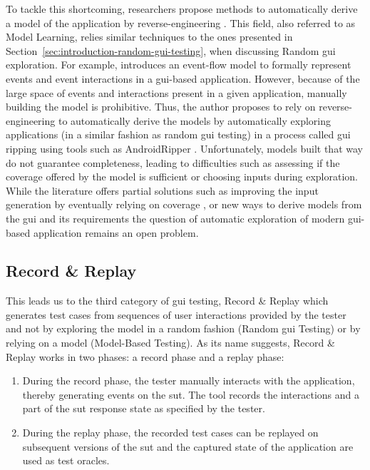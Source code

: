 To tackle this shortcoming, researchers propose methods to automatically derive a model of the application by reverse-engineering \cite{DiLucca2002, Memon2003, Amalfitano2015, Canny2020}. This field, also referred to as Model Learning, relies similar techniques to the ones presented in Section~\ref{sec:introduction-random-gui-testing}, when discussing Random \gls{gui} exploration. For example, \textcite{Memon2007} introduces an event-flow model to formally represent events and event interactions in a \gls{gui}-based application. However, because of the large space of events and interactions present in a given application, manually building the model is prohibitive. Thus, the author proposes to rely on reverse-engineering to automatically derive the models by automatically exploring applications (in a similar fashion as random \gls{gui} testing) in a process called \gls{gui} ripping \cite{Memon2003} using tools such as AndroidRipper \cite{Amalfitano2012}. Unfortunately, models built that way do not guarantee completeness, leading to difficulties such as assessing if the coverage offered by the model is sufficient or choosing inputs during exploration. While the literature offers partial solutions such as improving the input generation \cite{Biagiola2019} by eventually relying on coverage \cite{Yuan2007}, or new ways to derive models from the \gls{gui} and its requirements \cite{Canny2020} the question of automatic exploration of modern \gls{gui}-based application remains an open problem.

\subsection{Record \& Replay}
\label{sec:introduction-record-and-replay}

This leads us to the third category of \gls{gui} testing, Record \& Replay which generates test cases from sequences of user interactions provided by the tester and not by exploring the model in a random fashion (Random \gls{gui} Testing) or by relying on a model (Model-Based Testing). As its name suggests, Record \& Replay works in two phases: a record phase and a replay phase:

\begin{enumerate}
    \item During the record phase, the tester manually interacts with the application, thereby generating events on the \gls{sut}. The tool records the interactions and a part of the \gls{sut} response state as specified by the tester.
    \item During the replay phase, the recorded test cases can be replayed on subsequent versions of the \gls{sut} and the captured state of the application are used as test oracles.
\end{enumerate}

